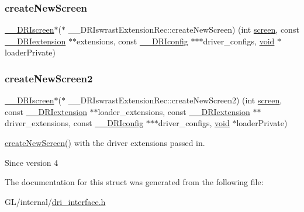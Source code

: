 \subsubsection{\texorpdfstring{create\+New\+Screen}{createNewScreen}}
{\footnotesize\ttfamily \hyperlink{dri__interface_8h_a9961b01d421ee1fd6ed3c05acc9ca561}{\+\_\+\+\_\+\+D\+R\+Iscreen}$\ast$($\ast$ \+\_\+\+\_\+\+D\+R\+Iswrast\+Extension\+Rec\+::create\+New\+Screen) (int \hyperlink{cad_8h_ae04e09e4e3831bfc1632c509ae37dcec}{screen}, const \hyperlink{dri__interface_8h_a4e0a61c8ece00d2b2c6792a9a1b55385}{\+\_\+\+\_\+\+D\+R\+Iextension} $\ast$$\ast$extensions, const \hyperlink{dri__interface_8h_aeac81999efbbf8b1d6886338e3ea24d9}{\+\_\+\+\_\+\+D\+R\+Iconfig} $\ast$$\ast$$\ast$driver\+\_\+configs, \hyperlink{_s_d_l__opengles2__gl2ext_8h_ae5d8fa23ad07c48bb609509eae494c95}{void} $\ast$loader\+Private)}

\mbox{\label{struct_____d_r_iswrast_extension_rec_a8b962980022f100567b9879b2bc1b22f}} 
\subsubsection{\texorpdfstring{create\+New\+Screen2}{createNewScreen2}}
{\footnotesize\ttfamily \hyperlink{dri__interface_8h_a9961b01d421ee1fd6ed3c05acc9ca561}{\+\_\+\+\_\+\+D\+R\+Iscreen}$\ast$($\ast$ \+\_\+\+\_\+\+D\+R\+Iswrast\+Extension\+Rec\+::create\+New\+Screen2) (int \hyperlink{cad_8h_ae04e09e4e3831bfc1632c509ae37dcec}{screen}, const \hyperlink{dri__interface_8h_a4e0a61c8ece00d2b2c6792a9a1b55385}{\+\_\+\+\_\+\+D\+R\+Iextension} $\ast$$\ast$loader\+\_\+extensions, const \hyperlink{dri__interface_8h_a4e0a61c8ece00d2b2c6792a9a1b55385}{\+\_\+\+\_\+\+D\+R\+Iextension} $\ast$$\ast$driver\+\_\+extensions, const \hyperlink{dri__interface_8h_aeac81999efbbf8b1d6886338e3ea24d9}{\+\_\+\+\_\+\+D\+R\+Iconfig} $\ast$$\ast$$\ast$driver\+\_\+configs, \hyperlink{_s_d_l__opengles2__gl2ext_8h_ae5d8fa23ad07c48bb609509eae494c95}{void} $\ast$loader\+Private)}

\hyperlink{struct_____d_r_iswrast_extension_rec_a2e6fb0aa44e0a62e42dba3b38a859651}{create\+New\+Screen()} with the driver extensions passed in.

\begin{DoxySince}{Since}
version 4 
\end{DoxySince}


The documentation for this struct was generated from the following file\+:\begin{DoxyCompactItemize}
\item 
G\+L/internal/\hyperlink{dri__interface_8h}{dri\+\_\+interface.\+h}\end{DoxyCompactItemize}
